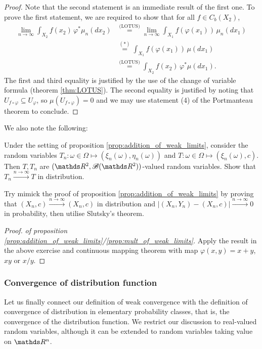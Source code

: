 \begin{proof}
Note that the second statement is an immediate result of the first one. To prove the first statement, we are required to show that for all $f \in C_b(X_2)$,
\begin{align*}
    \lim_{n\to\infty} \int_{X_2} f(x_2) \,\varphi^*\mu_n(dx_2) &\overset{\text{(LOTUS)}}{=} \lim_{n\to\infty} \int_{X_1} f(\varphi(x_1)) \,\mu_n(dx_1) \\
    &\overset{(*)}{=} \int_{X_1} f(\varphi(x_1)) \,\mu(dx_1) \\
    &\overset{\text{(LOTUS)}}{=} \int_{X_2} f(x_2) \, \varphi^*\mu(dx_1).
\end{align*}
The first and third equality is justified by the use of the change of variable formula (theorem \ref{thm:LOTUS}). The second equality is justified by noting that $U_{f \circ \varphi} \subseteq U_\varphi$, so $\mu(U_{f \circ \varphi}) = 0$ and we may use statement (4) of the Portmanteau theorem to conclude.
\end{proof}

We also note the following:
\begin{exercise}
Under the setting of proposition \ref{prop:addition_of_weak_limits}, consider the random variables $T_n: \omega \in \Omega \mapsto (\xi_n(\omega), \eta_n(\omega))$ and $T: \omega \in \Omega \mapsto (\xi_n(\omega), c)$. Then $T, T_n$ are $(\R^2, \B(\R^2))$-valued random variables. Show that $T_n \overset{n\to\infty}\to T$ in distribution. 
\end{exercise}

\begin{hint}
Try mimick the proof of proposition \ref{prop:addition_of_weak_limits} by proving that $(X_n, c) \overset{n\to\infty}{\to} (X_n, c)$ in distribution and $|(X_n, Y_n) - (X_n, c)| \overset{n\to\infty}{\to} 0$ in probability, then utilise Slutsky's theorem.
\end{hint}

\begin{proof}
\textit{of proposition \ref{prop:addition_of_weak_limits}/\ref{prop:mult_of_weak_limits}.} Apply the result in the above exercise and continuous mapping theorem with map $\varphi(x,y) = x+y$, $xy$ or $x/y$.
\end{proof}

\subsubsection{Convergence of distribution function}
Let us finally connect our definition of weak convergence with the definition of convergence of distribution in elementary probability classes, that is, the convergence of the distribution function. We restrict our discussion to real-valued random variables, although it can be extended to random variables taking value on $\R^n$.

